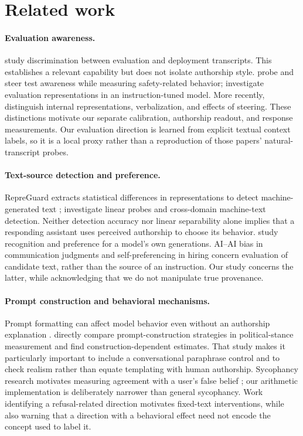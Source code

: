\documentclass[10pt,twocolumn]{article}
\begin{document}
\section{Related work}
\paragraph{Evaluation awareness.}
\citet{arxiv250523836} study discrimination between evaluation and deployment transcripts. This establishes a relevant capability but does not isolate authorship style. \citet{arxiv250514617} probe and steer test awareness while measuring safety-related behavior; \citet{arxiv250701786} investigate evaluation representations in an instruction-tuned model. More recently, \citet{arxiv260821766} distinguish internal representations, verbalization, and effects of steering. These distinctions motivate our separate calibration, authorship readout, and response measurements. Our evaluation direction is learned from explicit textual context labels, so it is a local proxy rather than a reproduction of those papers' natural-transcript probes.

\paragraph{Text-source detection and preference.}
RepreGuard extracts statistical differences in representations to detect machine-generated text \citep{arxiv250813152}; \citet{arxiv260824780} investigate linear probes and cross-domain machine-text detection. Neither detection accuracy nor linear separability alone implies that a responding assistant uses perceived authorship to choose its behavior. \citet{arxiv240413076} study recognition and preference for a model's own generations. AI--AI bias in communication judgments \citep{arxiv240712856} and self-preferencing in hiring \citep{arxiv250900462} concern evaluation of candidate text, rather than the source of an instruction. Our study concerns the latter, while acknowledging that we do not manipulate true provenance.

\paragraph{Prompt construction and behavioral mechanisms.}
Prompt formatting can affect model behavior even without an authorship explanation \citep{arxiv231011324}. \citet{arxiv260811008} directly compare prompt-construction strategies in political-stance measurement and find construction-dependent estimates. That study makes it particularly important to include a conversational paraphrase control and to check realism rather than equate templating with human authorship. Sycophancy research motivates measuring agreement with a user's false belief \citep{arxiv231013548}; our arithmetic implementation is deliberately narrower than general sycophancy. Work identifying a refusal-related direction \citep{arxiv240611717} motivates fixed-text interventions, while also warning that a direction with a behavioral effect need not encode the concept used to label it.
\end{document}
